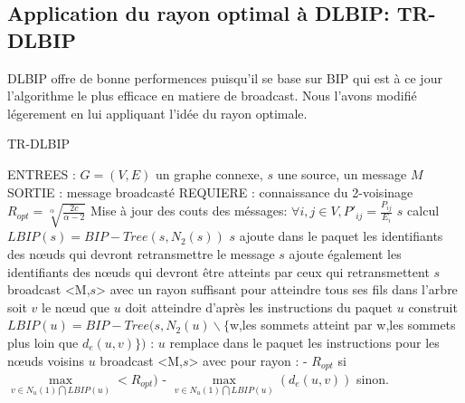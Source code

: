 \subsection{Application du rayon optimal à DLBIP: TR-DLBIP}

DLBIP offre de bonne performences puisqu'il se base sur BIP qui est à ce jour l'algorithme le plus efficace en matiere de broadcast.
Nous l'avons modifié légerement en lui appliquant l'idée du rayon optimale.

\begin{algorithm}[H]
\caption{TR-DLBIP}
\label{algo_TRDLBIP}
\begin{algorithmic}
\STATE ENTREES : $G=(V,E)$ un graphe connexe, $s$ une source, un message $M$
\STATE SORTIE : message broadcasté
\STATE REQUIERE : connaissance du 2-voisinage
\STATE $R_{opt}=\sqrt[\alpha]{\frac{2c}{\alpha-2}}$
\STATE Mise à jour des couts des méssages: $ \forall i,j \in V, P'_{ij}=\frac{P_{ij}}{E_i}$
\STATE $s$ calcul $LBIP(s)=BIP-Tree(s,N_2(s))$
\STATE $s$ ajoute dans le paquet les identifiants des nœuds qui devront retransmettre le message
\STATE $s$ ajoute également les identifiants des nœuds qui devront être atteints par ceux qui retransmettent
\STATE $s$ broadcast <M,$s$> avec un rayon suffisant pour atteindre tous ses fils dans l'arbre
		\STATE soit $v$ le nœud que $u$ doit atteindre d'après les instructions du paquet
		\STATE $u$ construit $LBIP(u)=BIP-Tree(s,N_2(u)\backslash \{$w,les sommets atteint par w,les sommets plus loin que $d_e(u,v)\})$ :
			\INDSTATE $u$ remplace dans le paquet les instructions pour les nœuds voisins
			\INDSTATE $u$ broadcast <M,$s$> avec pour rayon : 
			      \INDSTATE[2] - $R_{opt}$ si $\max\limits_{v\in N_u(1)\bigcap LBIP(u)}< R_{opt})$
			      \INDSTATE[2] - $\max\limits_{v\in N_u(1)\bigcap LBIP(u)}(d_e(u,v))$ sinon.
	\ENDIF
\ENDIF
\end{algorithmic}
\end{algorithm}


\subsection{}











